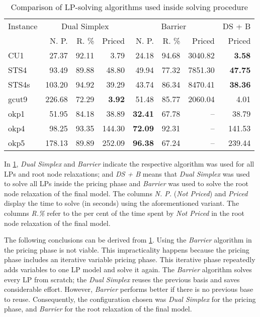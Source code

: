 \documentclass[ppgc,prop-tese,english,formais,babel]{iiufrgs}
\begin{document}
\begin{table}
\centering
\caption{Comparison of LP-solving algorithms used inside solving procedure}
\begin{tabular}{@{\extracolsep{4pt}}lrrrrrrr@{}}
\hline\hline
Instance & \multicolumn{3}{c}{Dual Simplex} & \multicolumn{3}{c}{Barrier} & DS + B \\\cline{2-4}\cline{5-7}
& N. P. & R. \% & Priced & N. P. & R. \% & Priced & Priced \\\hline
CU1 & 27.37 & 92.11 & 3.79 & 24.18 & 94.68 & 3040.82 & \textbf{3.58} \\
STS4 & 93.49 & 89.88 & 48.80 & 49.94 & 77.32 & 7851.30 & \textbf{47.75} \\
STS4s & 103.20 & 94.92 & 39.29 & 43.74 & 86.34 & 8470.41 & \textbf{38.36} \\
gcut9 & 226.68 & 72.29 & \textbf{3.92} & 51.48 & 85.77 & 2060.04 & 4.01 \\
okp1 & 51.95 & 84.18 & 38.89 & \textbf{32.41} & 67.78 & -- & 38.79 \\
okp4 & 98.25 & 93.35 & 144.30 & \textbf{72.09} & 92.31 & -- & 141.53 \\
okp5 & 178.13 & 89.89 & 252.09 & \textbf{96.38} & 67.24 & -- & 239.44 \\\hline\hline
\end{tabular}
\label{tab:lp_method_comparison}
\end{table}

In \cref{tab:lp_method_comparison}, \emph{Dual Simplex} and \emph{Barrier} indicate the respective algorithm was used for all LPs and root node relaxations;
and \emph{DS + B} means that \emph{Dual Simplex} was used to solve all LPs inside the pricing phase and \emph{Barrier} was used to solve the root node relaxation of the final model.
The columns \emph{N. P.} (\emph{Not Priced}) and \emph{Priced} display the time to solve (in seconds) using the aforementioned variant.
The columns \emph{R.\%} refer to the per cent of the time spent by \emph{Not Priced} in the root node relaxation of the final model.

The following conclusions can be derived from \cref{tab:lp_method_comparison}.
Using the \emph{Barrier} algorithm in the pricing phase is not viable.
This impracticality happens because the pricing phase includes an iterative variable pricing phase.
This iterative phase repeatedly adds variables to one LP model and solve it again.
The \emph{Barrier} algorithm solves every LP from scratch;
the \emph{Dual Simplex} reuses the previous basis and saves considerable effort.
However, \emph{Barrier} performs better if there is no previous base to reuse.
Consequently, the configuration chosen was \emph{Dual Simplex} for the pricing phase, and \emph{Barrier} for the root relaxation of the final model.
\end{document}
